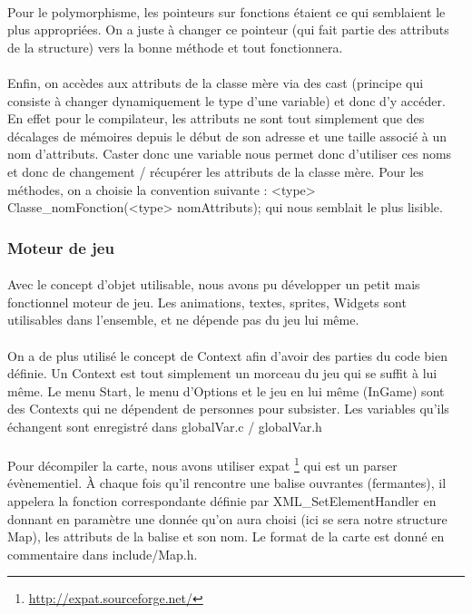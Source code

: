 \paragraph{} Pour le polymorphisme, les pointeurs sur fonctions étaient ce qui semblaient le plus appropriées. On a juste à changer ce pointeur (qui fait partie des attributs de la structure) vers la bonne méthode et tout fonctionnera.
\paragraph{} Enfin, on accèdes aux attributs de la classe mère via des cast (principe qui consiste à changer dynamiquement le type d'une variable) et donc d'y accéder. En effet pour le compilateur, les attributs ne sont tout simplement que des décalages de mémoires depuis le début de son adresse et une taille associé à un nom d'attributs. Caster donc une variable nous permet donc d'utiliser ces noms et donc de changement / récupérer les attributs de la classe mère. Pour les méthodes, on a choisie la convention suivante : <type> Classe_nomFonction(<type> nomAttributs); qui nous semblait le plus lisible.

\subsubsection{Moteur de jeu}

\paragraph{} Avec le concept d'objet utilisable, nous avons pu développer un petit mais fonctionnel moteur de jeu. Les animations, textes, sprites, Widgets sont utilisables dans l'ensemble, et ne dépende pas du jeu lui même.
\paragraph{} On a de plus utilisé le concept de Context afin d'avoir des parties du code bien définie. Un Context est tout simplement un morceau du jeu qui se suffit à lui même. Le menu Start, le menu d'Options et le jeu en lui même (InGame) sont des Contexts qui ne dépendent de personnes pour subsister. Les variables qu'ils échangent sont enregistré dans globalVar.c / globalVar.h
\paragraph{} Pour décompiler la carte, nous avons utiliser expat \footnote{\url{http://expat.sourceforge.net/}} qui est un parser évènementiel. À chaque fois qu'il rencontre une balise ouvrantes (fermantes), il appelera la fonction correspondante définie par XML_SetElementHandler en donnant en paramètre une donnée qu'on aura choisi (ici se sera notre structure Map), les attributs de la balise et son nom. Le format de la carte est donné en commentaire dans include/Map.h.
